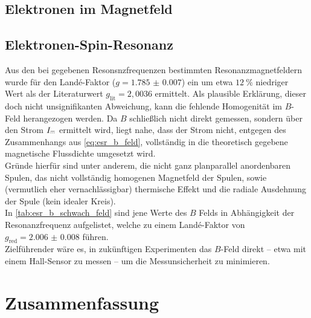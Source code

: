 \documentclass[ngerman]{scrartcl}
\newcommand{\mathdirectcurrent}{\mathrel{\mathpalette\mathdirectcurrentinner\relax}}
\newcommand{\mathdirectcurrentinner}[2]{%
  \settowidth{\dimen0}{$#1=$}%
  \vbox to .85ex {\offinterlineskip
    \hbox to \dimen0{\hss\leaders\hrule\hskip.85\dimen0\hss}
    \vskip.35ex
    \hbox to \dimen0{\hss
      \leaders\hrule\hskip.17\dimen0
      \hskip.17\dimen0
      \leaders\hrule\hskip.17\dimen0
      \hskip.17\dimen0
      \leaders\hrule\hskip.17\dimen0
    \hss}
    \vfill
  }%
}
\begin{document}
\subsection{Elektronen im Magnetfeld}

\subsection{Elektronen-Spin-Resonanz}
Aus den bei gegebenen Resonsnzfrequenzen bestimmten Resonanzmagnetfeldern wurde für den Landé-Faktor ($g = \num{1.785(7)}$) ein um etwa $\SI{12}{\percent}$ niedriger Wert als der Literaturwert $g_{\text{lit}} = 2,0036$ \cite{ref:angabe_esr} ermittelt.
Als plausible Erklärung, dieser doch nicht unsignifikanten Abweichung, kann die fehlende Homogenität im $B$-Feld herangezogen werden. Da $B$ schließlich nicht direkt gemessen, sondern über den Strom $I_{\mathdirectcurrent{}}$ ermittelt wird, liegt nahe, dass der Strom nicht, entgegen des Zusammenhangs aus \autoref{eq:esr_b_feld}, vollständig in die theoretisch gegebene magnetische Flussdichte umgesetzt wird. \\
Gründe hierfür sind unter anderem, die nicht ganz planparallel anordenbaren Spulen, das nicht vollständig homogenen Magnetfeld der Spulen, sowie (vermutlich eher vernachlässigbar) thermische Effekt und die radiale Ausdehnung der Spule (kein idealer Kreis). \\
In \autoref{tab:esr_b_schwach_feld} sind jene Werte des $B$ Felds in Abhängigkeit der Resonanzfrequenz aufgelistet, welche zu einem Landé-Faktor von $g_{\text{red}} = \num{2.006(8)}$ führen. \\
Zielführender wäre es, in zukünftigen Experimenten das $B$-Feld direkt -- etwa mit einem Hall-Sensor zu messen -- um die Messunsicherheit zu minimieren. 

\section{Zusammenfassung}
\label{sec:zusammenfassung}



\clearpage
\printbibliography

\listoffigures

\listoftables
\end{document}

